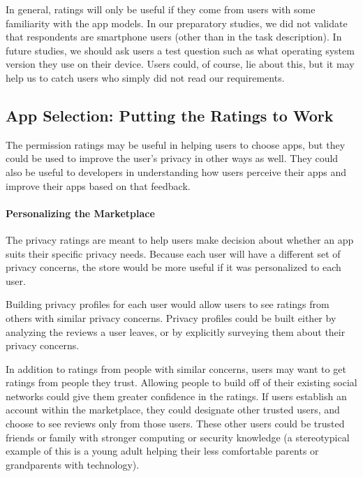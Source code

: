 \documentclass[11pt]{article}
\begin{document}
In general, ratings will only be useful if they come from users with some
familiarity with the app models.
In our preparatory studies, we did not validate that respondents are
smartphone users (other than in the task description). In future
studies, we should ask users a test question such as what operating
system version they use on their device. Users could, of course, lie
about this, but it may help us to catch users who simply did not read
our requirements.

\subsection{App Selection: Putting the Ratings to Work}
\label{subsec-app-selection}

The permission ratings may be useful in helping users to choose apps, but
they could be used to improve the user's privacy in other ways as well. They could
also be useful to developers in understanding how users perceive their apps 
and improve their apps based on that feedback.

\paragraph{Personalizing the Marketplace}
\label{subsubsec-personalizing}

The privacy ratings are meant to help users make decision about whether
an app suits their specific privacy needs. Because each user will have a different
set of privacy concerns, the store would be more useful if it was personalized
to each user.

Building privacy profiles for each user would allow users to see ratings from
others with similar privacy concerns. Privacy profiles could be built either by 
analyzing the reviews a user leaves, or by explicitly surveying them about their
privacy concerns. 

In addition to ratings from people with similar concerns, users may want to get
ratings from people they trust. Allowing people to build off of their existing 
social networks could give them greater confidence in the ratings. If users 
establish an account within the marketplace, they could designate other trusted
users, and choose to see reviews only from those users.
These other users could be trusted friends or family with stronger
computing or security knowledge (a stereotypical example of this is a
young adult helping their less comfortable parents or grandparents with technology).
\end{document}
